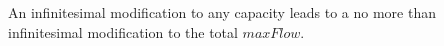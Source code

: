 \begin{proofsketch}
  An infinitesimal modification to any capacity leads to a no more than infinitesimal modification to the total $maxFlow$.
\end{proofsketch}
